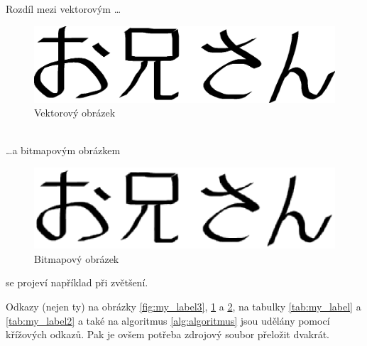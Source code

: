 \documentclass[11pt, a4paper]{article}
\begin{document}
\newpage
Rozdíl mezi vektorovým \ldots
\begin{figure}[h]
    \centering
    \includegraphics[scale=0.4]{oniisan.eps}
    \caption{Vektorový obrázek}
    \label{fig:my_label4}
\end{figure}
\\
\noindent\ldots  a bitmapovým obrázkem
\begin{figure}[h]
    \centering
    \includegraphics[scale=0.6]{oniisan2.eps}
    \caption{Bitmapový obrázek}
    \label{fig:my_label5}
\end{figure}

\noindent se projeví například při zvětšení.

Odkazy (nejen ty) na obrázky \ref{fig:my_label3}, \ref{fig:my_label4} a \ref{fig:my_label5}, na  
tabulky \ref{tab:my_label} a \ref{tab:my_label2} a také na algoritmus \ref{alg:algoritmus} jsou udělány pomocí 
křížových odkazů. Pak je ovšem potřeba zdrojový soubor přeložit dvakrát.
\end{document}

